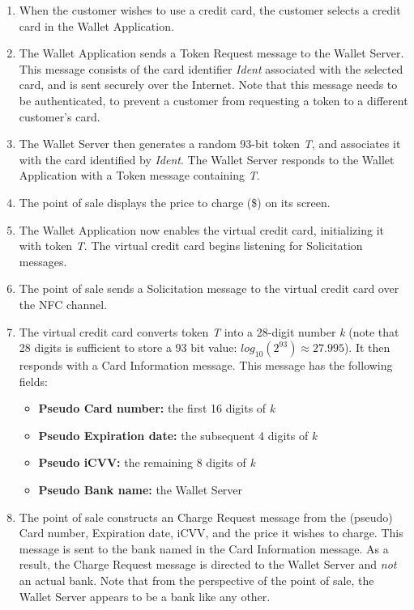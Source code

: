 \begin{enumerate}

\item When the customer wishes to use a credit card, the customer selects a credit card in the Wallet Application.

\item The Wallet Application sends a Token Request message to the Wallet Server.
    This message consists of the card identifier \emph{Ident} associated with the selected card, and is sent securely over the Internet.
    Note that this message needs to be authenticated, to prevent a customer from requesting a token to a different customer's card.

\item The Wallet Server then generates a random 93-bit token \emph{T}, and associates it with the card identified by \emph{Ident}.
    The Wallet Server responds to the Wallet Application with a Token message containing \emph{T}.

\item The point of sale displays the price to charge (\$) on its screen.

\item The Wallet Application now enables the virtual credit card, initializing it with token \emph{T}.
    The virtual credit card begins listening for Solicitation messages.

\item The point of sale sends a Solicitation message to the virtual credit card over the NFC channel.

\item The virtual credit card converts token \emph{T} into a 28-digit number \emph{k}
    (note that 28 digits is sufficient to store a 93 bit value: $log_{10}(2^{93}) \approx 27.995$).
    It then responds with a Card Information message.
    This message has the following fields:
    \begin{itemize}
    \item \textbf{Pseudo Card number:} the first 16 digits of \emph{k}
    \item \textbf{Pseudo Expiration date:} the subsequent 4 digits of \emph{k}
    \item \textbf{Pseudo iCVV:} the remaining 8 digits of \emph{k}
    \item \textbf{Pseudo Bank name:} the Wallet Server
   	\end{itemize}

\item The point of sale constructs an Charge Request message from the (pseudo) Card number, Expiration date, iCVV, and the price it wishes to charge.
    This message is sent to the bank named in the Card Information message.
    As a result, the Charge Request message is directed to the Wallet Server and \emph{not} an actual bank.
    Note that from the perspective of the point of sale, the Wallet Server appears to be a bank like any other.


\end{enumerate}
